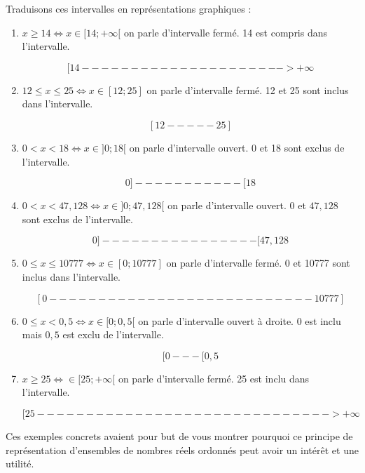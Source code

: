 \documentclass[a4paper, 11pt, twoside]{book}
\begin{document}
Traduisons ces intervalles en représentations graphiques :

\begin{enumerate}
\item \(x \geq 14 \iff x\in [14; +\infty [\) on parle d'intervalle
fermé. 14 est compris dans l'intervalle.

\[[14--------------------->+\infty\]

\item \(12 \leq x \leq 25\iff x\in [12; 25]\) on parle d'intervalle
fermé. 12 et 25 sont inclus dans l'intervalle.

\[[12-----25]\]

\item \(0 < x < 18\iff x\in ]0; 18[\) on parle d'intervalle ouvert.
0 et 18 sont exclus de l'intervalle.

\[0]-----------[18\]

\item \(0 < x < 47,128\iff x\in ]0; 47,128[\) on parle d'intervalle
ouvert. \(0\) et \(47,128\) sont exclus de l'intervalle.

\[0]----------------[47,128\]

\item \(0\leq x \leq 10 777\iff x\in [0; 10777]\) on parle d'intervalle
fermé. 0 et 10777 sont inclus dans l'intervalle.

\[[0---------------------------10777]\]

\item \(0 \leq x < 0,5\iff x\in [0; 0,5[\) on parle d'intervalle ouvert
à droite. \(0\) est inclu mais \(0,5\) est exclu de l'intervalle.

\[[0---[0,5\]

\item \(x \geq 25\iff \in [25; +\infty[\) on parle d'intervalle
fermé. 25 est inclu dans l'intervalle.

\[[25------------------------------>+\infty\]
\end{enumerate}


Ces exemples concrets avaient pour but de vous montrer pourquoi ce
principe de représentation d'ensembles de nombres réels ordonnés
peut avoir un intérêt et une utilité.
\end{document}
